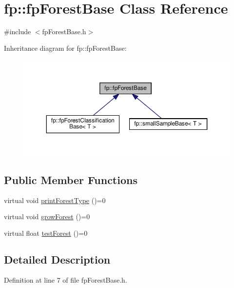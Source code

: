 \hypertarget{classfp_1_1fpForestBase}{}\section{fp\+:\+:fp\+Forest\+Base Class Reference}
\label{classfp_1_1fpForestBase}


{\ttfamily \#include $<$fp\+Forest\+Base.\+h$>$}



Inheritance diagram for fp\+:\+:fp\+Forest\+Base\+:\nopagebreak
\begin{figure}[H]
\begin{center}
\leavevmode
\includegraphics[width=350pt]{classfp_1_1fpForestBase__inherit__graph}
\end{center}
\end{figure}
\subsection*{Public Member Functions}
\begin{DoxyCompactItemize}
\item 
virtual void \hyperlink{classfp_1_1fpForestBase_a5e200f603cca94bb5d9f357489f07e97}{print\+Forest\+Type} ()=0
\item 
virtual void \hyperlink{classfp_1_1fpForestBase_a05b1d924a559536083ee7a8cf3ea542d}{grow\+Forest} ()=0
\item 
virtual float \hyperlink{classfp_1_1fpForestBase_af7becba028a198f650841b718d16ed16}{test\+Forest} ()=0
\end{DoxyCompactItemize}


\subsection{Detailed Description}


Definition at line 7 of file fp\+Forest\+Base.\+h.



